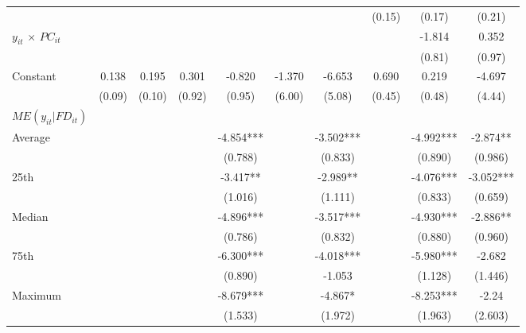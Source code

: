 \documentclass[12pt, a4paper]{article}
\begin{document}
\begin{appendices}
\begin{table}[htbp]
\begin{threeparttable}
{\begin{tabular}{l*{9}{c}}
				&                     &                     &                     &                     &                     &                     &      (0.15)         &      (0.17)         &      (0.21)         \\
				$y_{it}$ $\times$ $PC_{it}$ &                     &                     &                     &                     &                     &                     &                     &      -1.814\sym{*}  &       0.352         \\
				&                     &                     &                     &                     &                     &                     &                     &      (0.81)         &      (0.97)         \\
				Constant            &       0.138         &       0.195         &       0.301         &      -0.820         &      -1.370         &      -6.653         &       0.690         &       0.219         &      -4.697         \\
				&      (0.09)         &      (0.10)         &      (0.92)         &      (0.95)         &      (6.00)         &      (5.08)         &      (0.45)         &      (0.48)         &      (4.44)         \\
				\hline
				$ME(y_{it}|FD_{it})$\\
				Average &&&&	-4.854***	&&	-3.502***	&&	-4.992***	&	-2.874** \\
				&&&&(0.788)   &&		(0.833)   &&		(0.890)   	&	(0.986)   \\
				
				25th&&&&	-3.417** &&		-2.989** &&		-4.076***	&	-3.052***\\
				&&&&(1.016)	&&	(1.111)	&&	(0.833)   &		(0.659)   \\
				
				Median&&&&	-4.896***	&&	-3.517***	&&	-4.930***	&	-2.886** \\
				&&&&(0.786)   &&		(0.832)   &&		(0.880)   &		(0.960)   \\
				
				75th &&&&	-6.300***	&&	-4.018***	&&	-5.980***	&	-2.682\\
				&&&&(0.890)  && 		-1.053	&&	(1.128)	&	(1.446)\\
				
				Maximum&&&&	-8.679***	&&	-4.867*  &&		-8.253***	&	-2.24\\
				&&&&(1.533)	&&	(1.972)	&&	(1.963)	&	(2.603)\\
				

\end{tabular}}
\end{threeparttable}
\end{table}
\end{appendices}
\end{document}
